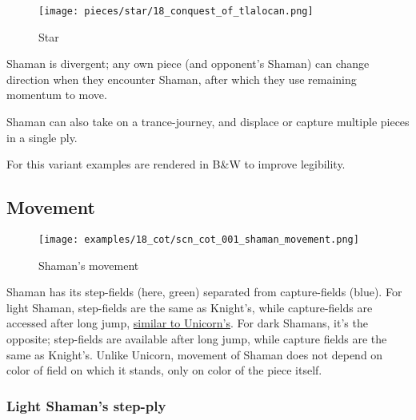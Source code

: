 \noindent
\begin{wrapfigure}[10]{l}{0.4\textwidth}
\centering
\texttt{[image: pieces/star/18\_conquest\_of\_tlalocan.png]}
\vspace*{-1.4\baselineskip}
\caption{Star}
\label{fig:star/18_conquest_of_tlalocan}
\end{wrapfigure}
Shaman is divergent; any own piece (and opponent's Shaman) can change direction
when they encounter Shaman, after which they use remaining momentum to move.

Shaman can also take on a trance-journey, and displace or capture multiple
pieces in a single ply.

\noindent
For this variant examples are rendered in B\&W to improve legibility.

\clearpage %

\subsection*{Movement}
\label{sec:Conquest of Tlalocan/Shaman/Movement}

\vspace*{-1.4\baselineskip}
\noindent
\begin{figure}[!h]
\texttt{[image: examples/18\_cot/scn\_cot\_001\_shaman\_movement.png]}
\vspace*{-1.4\baselineskip}
\caption{Shaman's movement}
\label{fig:scn_cot_001_shaman_movement}
\end{figure}

\vspace*{-0.4\baselineskip}
Shaman has its step-fields (here, green) separated from capture-fields (blue). For
light Shaman, step-fields are the same as Knight's, while capture-fields are accessed
after long jump, \hyperref[fig:scn_aoa_02_unicorn_opposite_color]{similar to Unicorn's}.
For dark Shamans, it's the opposite; step-fields are available after long jump, while
capture fields are the same as Knight's. Unlike Unicorn, movement of Shaman does not
depend on color of field on which it stands, only on color of the piece itself.

\clearpage %

\subsubsection*{Light Shaman's step-ply}
\label{sec:Conquest of Tlalocan/Shaman/Movement/Light Shaman's step-ply}

